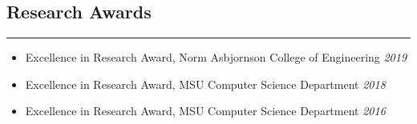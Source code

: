 %
%


\subsection*{Research Awards}
\hrule
\vspace{0.2cm}
\begin{itemize}

    \item Excellence in Research Award, Norm Asbjornson College of Engineering
    \hfill {\it
    2019}

    \item Excellence in Research Award, MSU Computer Science Department \hfill
    {\it 2018}

    \item Excellence in Research Award, MSU Computer Science Department \hfill
    {\it 2016}


\end{itemize}
